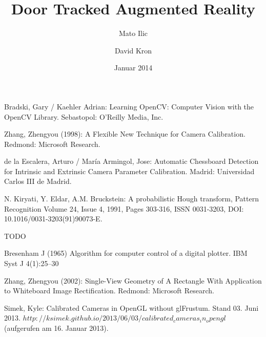 \documentclass[listof=totocnumbered,bibliography=totocnumbered,12pt,oneside]{scrreprt}
\numberwithin{equation}{subsection}
\begin{document}
\pagestyle{fancy}

\subject{Bachelor-Thesis}
\title{Door Tracked Augmented Reality}
\author{Mato Ilic \and David Kron}
\date{Januar 2014}
\publishers{Betreuer: Marcus Hudritsch\\Experte: Andreas Dürsteler}

\maketitle


\newpage

\tableofcontents
\newpage


\newpage


\newpage


\newpage

%


\newpage


\newpage


\newpage


\newpage


\newpage
\begin{thebibliography}{5}

Bradski, Gary / Kaehler Adrian:
Learning OpenCV: Computer Vision with the OpenCV Library.
Sebastopol: O'Reilly Media, Inc.

Zhang, Zhengyou (1998): A Flexible New Technique for Camera Calibration. 
Redmond: Microsoft Research.

de la Escalera, Arturo / María Armingol, Jose: Automatic Chessboard Detection for Intrinsic and Extrinsic Camera Parameter Calibration. 
Madrid: Universidad Carlos III de Madrid.

N. Kiryati, Y. Eldar, A.M. Bruckstein:
A probabilistic Hough transform, Pattern Recognition 
Volume 24, Issue 4, 1991, Pages 303-316, ISSN 0031-3203, DOI: 10.1016/0031-3203(91)90073-E. 

TODO

Bresenham J (1965) Algorithm for computer control of a digital plotter. IBM Syst J 4(1):25–30

Zhang, Zhengyou (2002): Single-View Geometry of A Rectangle With Application to Whiteboard Image Rectification.
Redmond: Microsoft Research.

Simek, Kyle: Calibrated Cameras in OpenGL without glFrustum. Stand 03. Juni 2013. $http://ksimek.github.io/2013/06/03/calibrated_cameras_in_opengl$  (aufgerufen am 16. Januar 2013).


\end{thebibliography}
\end{document}
